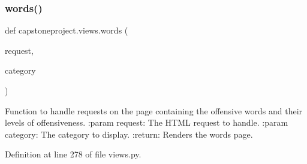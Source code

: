 \mbox{\label{namespacecapstoneproject_1_1views_ac40142fdb38f6de08b00630753fd243a}} 
\subsubsection{\texorpdfstring{words()}{words()}}
{\footnotesize\ttfamily def capstoneproject.\+views.\+words (\begin{DoxyParamCaption}\item[{}]{request,  }\item[{}]{category }\end{DoxyParamCaption})}

\begin{DoxyVerb}Function to handle requests on the page containing the offensive words and
    their levels of offensiveness.
:param request: The HTML request to handle.
:param category: The category to display.
:return: Renders the words page.
\end{DoxyVerb}
 

Definition at line 278 of file views.\+py.

